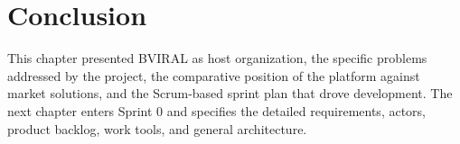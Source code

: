 \section*{Conclusion}

This chapter presented BVIRAL as host organization, the specific problems addressed by the
project, the comparative position of the platform against market solutions, and the Scrum-based
sprint plan that drove development. The next chapter enters Sprint 0 and specifies the detailed
requirements, actors, product backlog, work tools, and general architecture.
